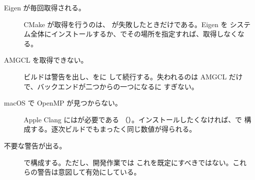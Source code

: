 \begin{description}
  \item[Eigen が毎回取得される。] CMake が取得を行うのは、
    が失敗したときだけである。Eigen を
    システム全体にインストールするか、でその場所を指定すれば、取得しなくなる。
  \item[AMGCL を取得できない。] ビルドは警告を出し、をに
    して続行する。失われるのは AMGCL だけで、バックエンドが二つからの一つになるに
    すぎない。
  \item[macOS で OpenMP が見つからない。] Apple Clang にはが必要である
    （）。インストールしたくなければ、で
    構成する。逐次ビルドでもまったく同じ数値が得られる。
  \item[不要な警告が出る。] で構成する。ただし、開発作業では
    これを既定にすべきではない。これらの警告は意図して有効にしている。
\end{description}
